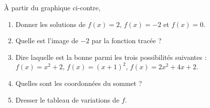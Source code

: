 
\begin{exercice}\label{exoPremiere-0059}

    \begin{minipage}{0.5\textwidth}
    À partir du graphique ci-contre,
    \begin{enumerate}
        \item
            Donner les solutions de \( f(x)=2\), \( f(x)=-2\) et \( f(x)=0\).
\item
    Quelle est l'image de \( -2\) par la fonction tracée ?
\item
    Dire laquelle est la bonne parmi les trois possibilités suivantes : \( f(x)=x^2+2\), \( f(x)=(x+1)^2\), \( f(x)=2x^2+4x+2\).
\item
    Quelles sont les coordonnées du sommet ?
\item
    Dresser le tableau de variations de \( f\).
    \end{enumerate}
    \end{minipage}
    \hspace{1mm}
    \begin{minipage}{0.5\textwidth}
   \centering     
   
    \end{minipage}

\end{exercice}
